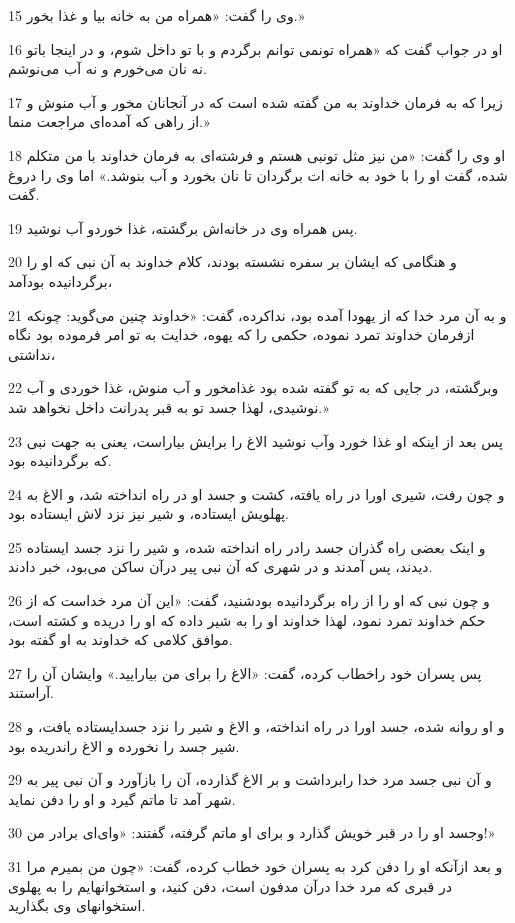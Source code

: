 \par 15 وی را گفت: «همراه من به خانه بیا و غذا بخور.»
\par 16 او در جواب گفت که «همراه تونمی توانم برگردم و با تو داخل شوم، و در اینجا باتو نه نان می‌خورم و نه آب می‌نوشم.
\par 17 زیرا که به فرمان خداوند به من گفته شده است که در آنجانان مخور و آب منوش و از راهی که آمده‌ای مراجعت منما.»
\par 18 او وی را گفت: «من نیز مثل تونبی هستم و فرشته‌ای به فرمان خداوند با من متکلم شده، گفت او را با خود به خانه ات برگردان تا نان بخورد و آب بنوشد.» اما وی را دروغ گفت.
\par 19 پس همراه وی در خانه‌اش برگشته، غذا خوردو آب نوشید.
\par 20 و هنگامی که ایشان بر سفره نشسته بودند، کلام خداوند به آن نبی که او را برگردانیده بودآمد،
\par 21 و به آن مرد خدا که از یهودا آمده بود، نداکرده، گفت: «خداوند چنین می‌گوید: چونکه ازفرمان خداوند تمرد نموده، حکمی را که یهوه، خدایت به تو امر فرموده بود نگاه نداشتی،
\par 22 وبرگشته، در جایی که به تو گفته شده بود غذامخور و آب منوش، غذا خوردی و آب نوشیدی، لهذا جسد تو به قبر پدرانت داخل نخواهد شد.»
\par 23 پس بعد از اینکه او غذا خورد وآب نوشید الاغ را برایش بیاراست، یعنی به جهت نبی که برگردانیده بود.
\par 24 و چون رفت، شیری اورا در راه یافته، کشت و جسد او در راه انداخته شد، و الاغ به پهلویش ایستاده، و شیر نیز نزد لاش ایستاده بود.
\par 25 و اینک بعضی راه گذران جسد رادر راه انداخته شده، و شیر را نزد جسد ایستاده دیدند، پس آمدند و در شهری که آن نبی پیر درآن ساکن می‌بود، خبر دادند.
\par 26 و چون نبی که او را از راه برگردانیده بودشنید، گفت: «این آن مرد خداست که از حکم خداوند تمرد نمود، لهذا خداوند او را به شیر داده که او را دریده و کشته است، موافق کلامی که خداوند به او گفته بود.
\par 27 پس پسران خود راخطاب کرده، گفت: «الاغ را برای من بیارایید.» وایشان آن را آراستند.
\par 28 و او روانه شده، جسد اورا در راه انداخته، و الاغ و شیر را نزد جسدایستاده یافت، و شیر جسد را نخورده و الاغ راندریده بود.
\par 29 و آن نبی جسد مرد خدا رابرداشت و بر الاغ گذارده، آن را بازآورد و آن نبی پیر به شهر آمد تا ماتم گیرد و او را دفن نماید.
\par 30 وجسد او را در قبر خویش گذارد و برای او ماتم گرفته، گفتند: «وای‌ای برادر من!»
\par 31 و بعد ازآنکه او را دفن کرد به پسران خود خطاب کرده، گفت: «چون من بمیرم مرا در قبری که مرد خدا درآن مدفون است، دفن کنید، و استخوانهایم را به پهلوی استخوانهای وی بگذارید.
